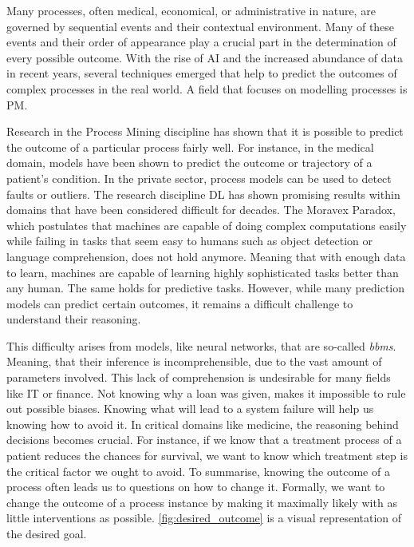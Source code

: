 \documentclass[./../../paper.tex]{subfiles}
\begin{document}
Many processes, often medical, economical, or administrative in nature, are governed by sequential events and their contextual environment. Many of these events and their order of appearance play a crucial part in the determination of every possible outcome\autocite{vanderaalst_ProcessMiningManifesto_2012}. With the rise of AI and the increased abundance of data in recent years, several techniques emerged that help to predict the outcomes of complex processes in the real world. A field that focuses on modelling processes is \gls{PM}.

Research in the Process Mining discipline has shown that it is possible to predict the outcome of a particular process fairly well\autocites{tax_PredictiveBusinessProcess_2017a,klimek_Longtermseriesforecasting_2021}. 
For instance, in the medical domain, models have been shown to predict the outcome or trajectory of a patient's condition\autocite{mannhardt_Analyzingtrajectoriespatients_2017}. In the private sector, process models can be used to detect faults or outliers. The research discipline \gls{DL} has shown promising results within domains that have been considered difficult for decades. The Moravex Paradox\autocite{agrawal_studyphenomenonMoravec_2010}, which postulates that machines are capable of doing complex computations easily while failing in tasks that seem easy to humans such as object detection or language comprehension, does not hold anymore. Meaning that with enough data to learn, machines are capable of learning highly sophisticated tasks better than any human. The same holds for predictive tasks. However, while many prediction models can predict certain outcomes, it remains a difficult challenge to understand their reasoning. 

This difficulty arises from models, like neural networks, that are so-called \emph{\glspl{bbm}}. Meaning, that their inference is incomprehensible, due to the vast amount of parameters involved. This lack of comprehension is undesirable for many fields like IT or finance. Not knowing why a loan was given, makes it impossible to rule out possible biases. Knowing what will lead to a system failure will help us knowing how to avoid it. In critical domains like medicine, the reasoning behind decisions becomes crucial. For instance, if we know that a treatment process of a patient reduces the chances for survival, we want to know which treatment step is the critical factor we ought to avoid. To summarise, knowing the outcome of a process often leads us to questions on how to change it. Formally, we want to change the outcome of a process instance by making it maximally likely with as little interventions as possible\autocite{molnar2019}. \autoref{fig:desired_outcome} is a visual representation of the desired goal.
\end{document}
